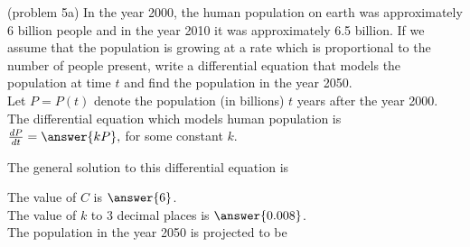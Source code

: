 \documentclass[handout]{ximera}
\begin{document}
\begin{problem}(problem 5a)
In the year 2000, the human population on earth was approximately 6 billion people and in the year 2010 it was approximately 6.5 billion. 
If we assume that the population is growing at a rate which is proportional to the number of people present,
write a differential equation that models the population at time $t$ and find the population in the year 2050.\\


Let $P = P(t)$ denote the population  (in billions)  $t$ years after the year 2000.\\
The differential equation which models human population is\\

$\frac{dP}{dt} = \answer{k P},$ for some constant $k$.

The general solution to this differential equation is 

\begin{multipleChoice}
\end{multipleChoice}

The value of $C$ is $\answer{6}$.\\
The value of $k$ to 3 decimal places is $\answer{0.008}$.\\
The population in the year 2050 is projected to be 

\begin{multipleChoice}
\end{multipleChoice}

\end{problem}
\end{document}
